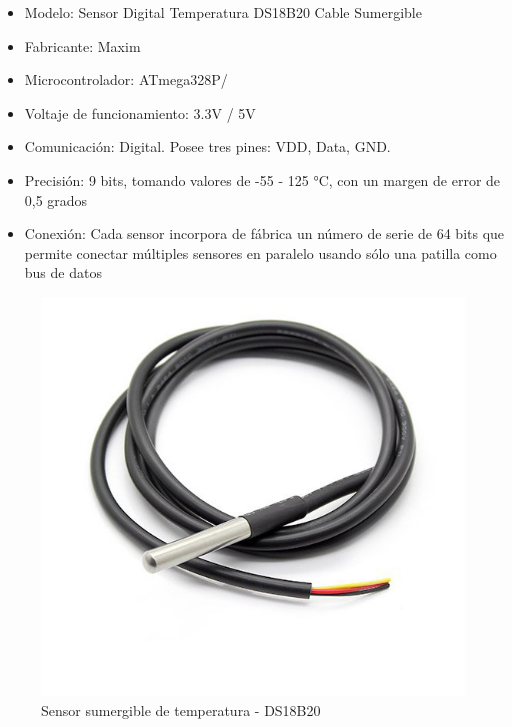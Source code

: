                 \begin{itemize}
                    \item Modelo: Sensor Digital Temperatura DS18B20 Cable Sumergible
                    \item Fabricante: Maxim
                    \item Microcontrolador: ATmega328P/
                    \item Voltaje de funcionamiento: 3.3V / 5V
                    \item Comunicación: Digital. Posee tres pines: VDD, Data, GND.
                    \item Precisión: 9 bits, tomando valores de -55 - 125 °C, con un margen de error de 0,5 grados
                    \item Conexión: Cada sensor incorpora de fábrica un número de serie de 64 bits que permite conectar múltiples sensores en paralelo usando sólo una patilla como bus de datos
                \end{itemize}
                
                \begin{figure} [h]
                    \centering
                    \includegraphics[scale=0.35]{hardware/ds18b20.jpg}
                    \caption{Sensor sumergible de temperatura - DS18B20}
                    \label{SensorTemp}
                \end{figure}
                

